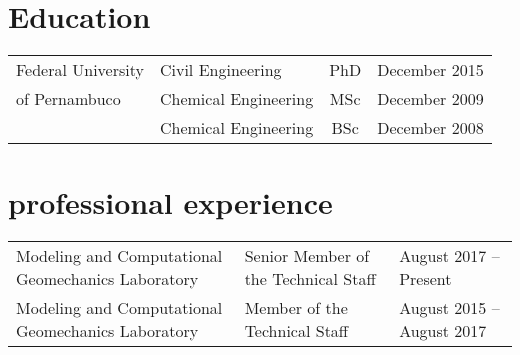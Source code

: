 \ifdefined\isinstitutional
  \section*{Education}
  \begin{tabular}{llcl}
    Federal University  & Civil Engineering     & PhD & December 2015 \\
    of Pernambuco       & Chemical Engineering  & MSc & December 2009 \\
                        & Chemical Engineering  & BSc & December 2008
  \end{tabular}

%
%

% 

\section*{professional experience}


\begin{tabular}{lll}
  Modeling and Computational Geomechanics Laboratory & Senior Member of the Technical 
Staff  & August 2017 -- Present \\
  Modeling and Computational Geomechanics Laboratory & Member of the Technical Staff &  
August 2015 -- August 2017
\end{tabular}

